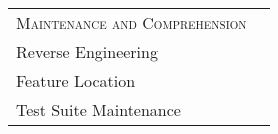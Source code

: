 \begin{table}[t]
\begin{tabular}{l @{\hskip 1em} p{3.8cm}}
\textsc{Maintenance and Comprehension} & \\
\quad Reverse Engineering &  \cite{Nguyen-2015-ASE, Deka-2016-UIST, Deka-2017-UIST, Bajammal-2018-ICST} \\ 
\quad Feature Location & \cite{Burg-2015-UIST} \\ 
\quad Test Suite Maintenance & \cite{Leotta-2018-STVR} \\ 
			
\bottomrule
\end{tabular}
\label{table:software-engineering-tasks}
\end{table}
